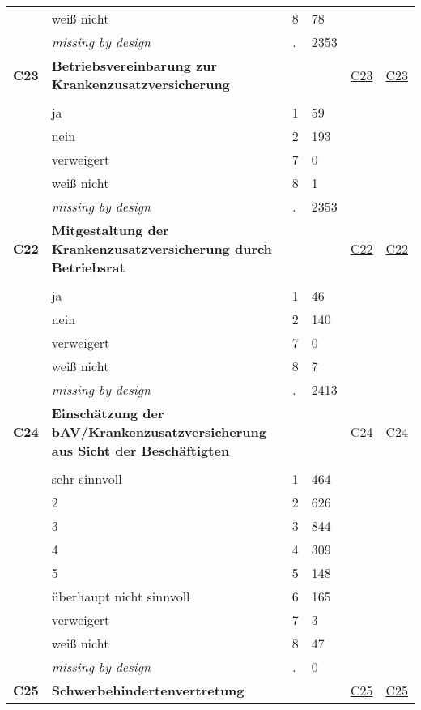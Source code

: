 \begin{longtable}{| L{2.45cm} | L{6cm} | C{1.5cm} | R{1cm} | C{2.25cm} | C{2.25cm} |}
   & weiß nicht & 8 & 78 &  &  \\ 
   & \textit{missing by design} & \textit{.} & 2353 &  &  \\ 
   \midrule
\textbf{C23}\label{var:C23} & \textbf{Betriebsvereinbarung zur Krankenzusatzversicherung} &  &  & \hyperref[C23]{C23} & \hyperref[var:suf:C23]{C23} \\ 
   &  &  &  &  &  \\ 
   & ja & 1 & 59 &  &  \\ 
   & nein & 2 & 193 &  &  \\ 
   & verweigert & 7 & 0 &  &  \\ 
   & weiß nicht & 8 & 1 &  &  \\ 
   & \textit{missing by design} & \textit{.} & 2353 &  &  \\ 
   \midrule
\textbf{C22}\label{var:C22} & \textbf{Mitgestaltung der Krankenzusatzversicherung durch Betriebsrat} &  &  & \hyperref[C22]{C22} & \hyperref[var:suf:C22]{C22} \\ 
   &  &  &  &  &  \\ 
   & ja & 1 & 46 &  &  \\ 
   & nein & 2 & 140 &  &  \\ 
   & verweigert & 7 & 0 &  &  \\ 
   & weiß nicht & 8 & 7 &  &  \\ 
   & \textit{missing by design} & \textit{.} & 2413 &  &  \\ 
   \midrule
\textbf{C24}\label{var:C24} & \textbf{Einschätzung der bAV/Krankenzusatzversicherung aus Sicht der Beschäftigten} &  &  & \hyperref[C24]{C24} & \hyperref[var:suf:C24]{C24} \\ 
   &  &  &  &  &  \\ 
   & sehr sinnvoll & 1 & 464 &  &  \\ 
   & 2 & 2 & 626 &  &  \\ 
   & 3 & 3 & 844 &  &  \\ 
   & 4 & 4 & 309 &  &  \\ 
   & 5 & 5 & 148 &  &  \\ 
   & überhaupt nicht sinnvoll & 6 & 165 &  &  \\ 
   & verweigert & 7 & 3 &  &  \\ 
   & weiß nicht & 8 & 47 &  &  \\ 
   & \textit{missing by design} & \textit{.} & 0 &  &  \\ 
   \midrule
\textbf{C25}\label{var:C25} & \textbf{Schwerbehindertenvertretung} &  &  & \hyperref[C25]{C25} & \hyperref[var:suf:C25]{C25} \\ 

\end{longtable}
